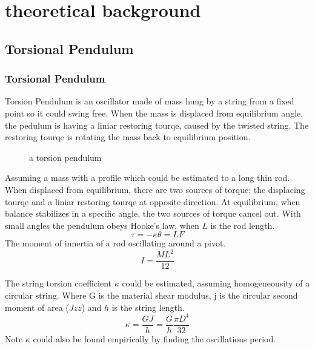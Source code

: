 \documentclass[\main/master.tex]{subfiles}
\begin{document}
\chapter{theoretical background}\label{chp:example-2}


\section{Torsional Pendulum}
\subsection{Torsional Pendulum}
Torsion Pendulum is an oscillator made of mass hung by a string from a fixed point so it could swing free. When the mass is displaced from equilibrium angle, the pedulum is having a liniar restoring tourqe, caused by the twisted string. The restoring tourqe is rotating the mass back to equilibrium position.


\begin{figure}[htbp]
	\centering
	\caption[pendulum]{a torsion pendulum}
	\label{fig:torsion_pendulum}
\end{figure}

Assuming a mass with a profile which could be estimated to a long thin rod. When displaced from equilibrium, there are two sources of torque; the displacing tourqe and a liniar restoring tourqe at opposite direction. At equilibrium, when balance stabilizes in a specific angle, the two sources of torque cancel out. With small angles the pendulum obeys Hooke’s law, when $L$ is the rod length.
\begin{equation}
\tau = -\kappa\theta = LF    \label{eqn:Hooke_law}
\end{equation}
The moment of innertia of a rod oscillating around a pivot.
\begin{equation}
I = \frac{ML^2}{12}     \label{eqn:moment_innertia}
\end{equation}  


The string torsion coefficient $\kappa $ could be estimated, assuming homogeneousity of a circular string. Where G is the material shear modulus, j is the circular second moment of area ($Jzz$) and $h$ is the string length.
\begin{equation}
\kappa = \frac{GJ}{h} = \frac{G}{h} \frac{\pi D^4}{32}    \label{eqn:torsion_coefficient}
\end{equation}
Note  $\kappa$ could also be found empirically by finding  the  oscillations period.
 
\end{document}
